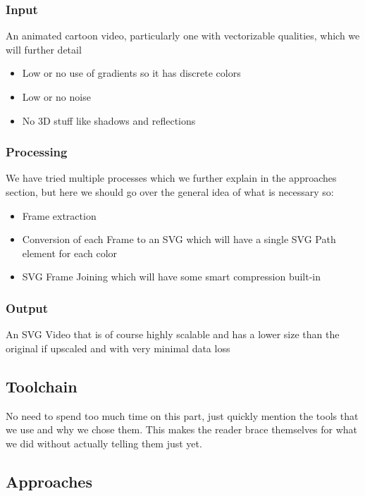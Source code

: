\documentclass[12pt]{article}
\begin{document}
    \subsubsection{Input}

    An animated cartoon video, particularly one with vectorizable qualities, which we will further detail
    \begin{itemize}
        \item Low or no use of gradients so it has discrete colors
        \item Low or no noise
        \item No 3D stuff like shadows and reflections
    \end{itemize}

    \subsubsection{Processing}

    We have tried multiple processes which we further explain in the approaches section, but here
    we should go over the general idea of what is necessary so:
    \begin{itemize}
        \item Frame extraction
        \item Conversion of each Frame to an SVG which will have a single SVG Path element for each color
        \item SVG Frame Joining which will have some smart compression built-in
    \end{itemize}

    \subsubsection{Output}

    An SVG Video that is of course highly scalable and has a lower size than the original if upscaled and with
    very minimal data loss

    \subsection{Toolchain}

    No need to spend too much time on this part, just quickly mention the tools that we use and why we chose them.
    This makes the reader brace themselves for what we did without actually telling them just yet.

    \subsection{Approaches}
\end{document}
